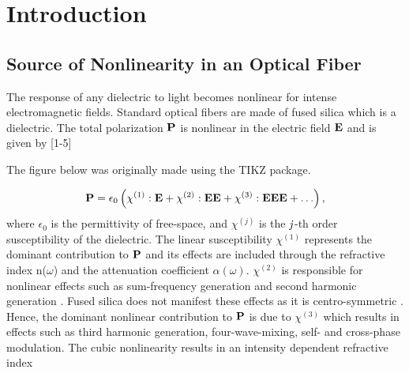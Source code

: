 
\renewcommand{\thechapter}{1}

\vspace*{-1.35in}

\chapter{Introduction}

\vspace*{-.5in}
\section{Source of Nonlinearity in an Optical Fiber}

The response of any dielectric to light becomes nonlinear for
intense electromagnetic fields.  Standard optical fibers are made
of fused silica which is a dielectric. The total polarization
$\bf{P}$ is nonlinear in the electric field $\bf{E}$ and is given
by [1-5]

The figure below was originally made using the TIKZ package.

\begin{center}
\end{center}



\begin{equation}
{\bf P} = \epsilon_{0} \left( \chi^{(1)} : {\bf E} + \chi^{(2)}
: {\bf EE} + \chi^{(3)} : {\bf EEE} + \ldots \right),
\end{equation}
where $\epsilon_0$ is the permittivity of free-space, and
$\chi^{(j)}$ is the ${\it j}$-th order susceptibility of the
dielectric. The linear susceptibility $\chi^{(1)}$ represents the
dominant contribution to $\bf{P}$ and its effects are included
through the refractive index n($\omega$) and the attenuation
coefficient $\alpha(\omega)$. $\chi^{(2)}$ is responsible for
nonlinear effects such as sum-frequency generation and second
harmonic generation \cite{Agrawal1, Shen}. Fused silica
does not manifest these effects as it is centro-symmetric
\cite{Newell}. Hence, the dominant nonlinear contribution to ${\bf
P}$ is due to $\chi^{(3)}$ which results in effects such as third
harmonic generation, four-wave-mixing,  self- and cross-phase
modulation. The cubic nonlinearity results in an intensity
dependent refractive index

